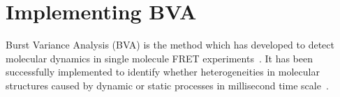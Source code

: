 \section{Implementing BVA}


Burst Variance Analysis (BVA) is the method which has developed to detect molecular dynamics in single molecule FRET experiments~\cite{Torella_2011}. It has been successfully implemented to identify whether heterogeneities in molecular structures caused by dynamic or static processes in millisecond time scale~\cite{Torella_2011}\cite{Robb_2013}.